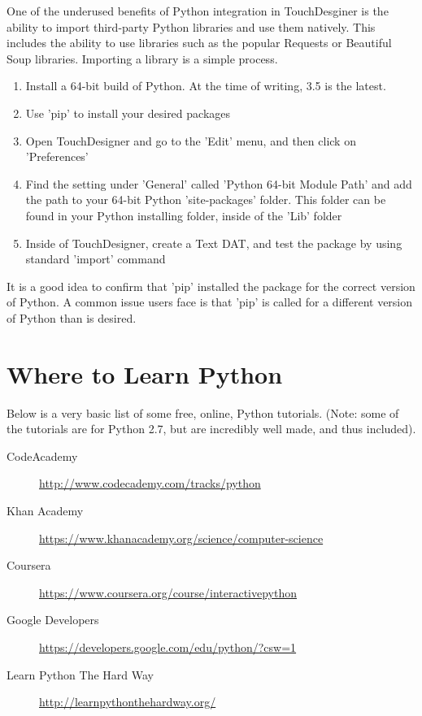 \begin{fullwidth}

One of the underused benefits of Python integration in TouchDesginer is the ability to import third-party Python libraries and use them natively. This includes the ability to use libraries such as the popular Requests or Beautiful Soup libraries. Importing a library is a simple process.

\begin{enumerate}
\item Install a 64-bit build of Python. At the time of writing, 3.5 is the latest.
\item Use 'pip' to install your desired packages
\item Open TouchDesigner and go to the 'Edit' menu, and then click on 'Preferences'
\item Find the setting under 'General' called 'Python 64-bit Module Path' and add the path to your 64-bit Python 'site-packages' folder. This folder can be found in your Python installing folder, inside of the 'Lib' folder
\item Inside of TouchDesigner, create a Text DAT, and test the package by using standard 'import' command
\end{enumerate}

It is a good idea to confirm that 'pip' installed the package for the correct version of Python. A common issue users face is that 'pip' is called for a different version of Python than is desired.

\end{fullwidth}


\section{Where to Learn Python}

\begin{fullwidth}

Below is a very basic list of some free, online, Python tutorials. (Note: some of the tutorials are for Python 2.7, but are incredibly well made, and thus included).

\begin{description}
\item[CodeAcademy] \url{http://www.codecademy.com/tracks/python}
\item[Khan Academy] \url{https://www.khanacademy.org/science/computer-science}
\item[Coursera] \url{https://www.coursera.org/course/interactivepython}
\item[Google Developers] \url{https://developers.google.com/edu/python/?csw=1}
\item[Learn Python The Hard Way] \url{http://learnpythonthehardway.org/}
\end{description}

\end{fullwidth}
